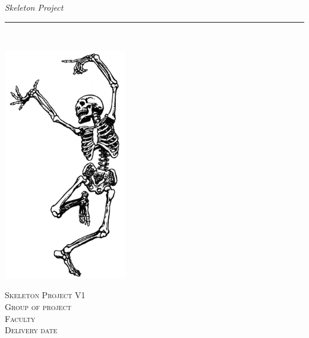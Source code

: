 \thispagestyle{empty}
\begin{flushright}
\vspace{3cm}

\phantom{hul}

\phantom{hul}

\phantom{hul}

\textsl{\Huge Skeleton Project} \\ \vspace{1cm}

\rule{13cm}{3mm} \\ \vspace{1.5cm}
\vspace{1cm}

\includegraphics[width=0.4\textwidth]{pictures/skeleton-cover.jpg}

\vspace{2cm} 
\textsc{\Large Skeleton Project V1 \\
Group of project \\
Faculty\\
Delivery date\\}
\end{flushright}
